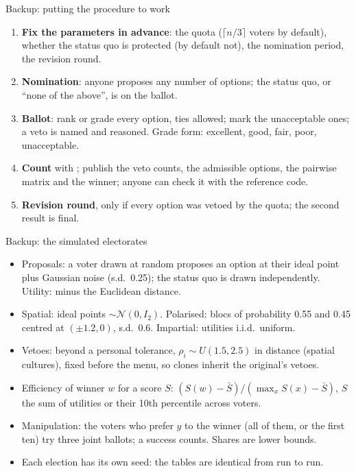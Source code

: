 \documentclass[10pt,aspectratio=169]{beamer}
\begin{document}
\begin{frame}{Backup: putting the procedure to work}
  \begin{enumerate}
    \item \textbf{Fix the parameters in advance}: the quota ($\lceil n/3 \rceil$ voters by default), whether the
      status quo is protected (by default not), the nomination period, the revision round.
    \item \textbf{Nomination}: anyone proposes any number of options; the status quo, or ``none of the
      above'', is on the ballot.
    \item \textbf{Ballot}: rank or grade every option, ties allowed; mark the unacceptable ones; a veto is
      named and reasoned. Grade form: excellent, good, fair, poor, unacceptable.
    \item \textbf{Count} with \QVC; publish the veto counts, the admissible options, the pairwise matrix and
      the winner; anyone can check it with the reference code.
    \item \textbf{Revision round}, only if every option was vetoed by the quota; the second result is final.
  \end{enumerate}
  \medskip
\end{frame}

\begin{frame}{Backup: the simulated electorates}
  \begin{itemize}\small
    \item Proposals: a voter drawn at random proposes an option at their ideal point plus Gaussian noise
      (s.d.\ 0.25); the status quo is drawn independently. Utility: minus the Euclidean distance.
    \item Spatial: ideal points $\sim \mathcal{N}(0, I_2)$. Polarised: blocs of probability 0.55 and 0.45
      centred at $(\pm 1.2, 0)$, s.d.\ 0.6. Impartial: utilities i.i.d.\ uniform.
    \item Vetoes: beyond a personal tolerance, $\rho_i \sim U(1.5, 2.5)$ in distance (spatial cultures),
      fixed before the menu, so clones inherit the original's vetoes.
    \item Efficiency of winner $w$ for a score $S$: $(S(w) - \bar S)/(\max_x S(x) - \bar S)$, $S$ the sum of
      utilities or their 10th percentile across voters.
    \item Manipulation: the voters who prefer $y$ to the winner (all of them, or the first ten) try three
      joint ballots; a success counts. Shares are lower bounds.
    \item Each election has its own seed: the tables are identical from run to run.
  \end{itemize}
\end{frame}
\end{document}

